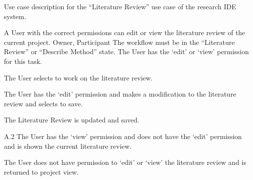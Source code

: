 \begin{table}
  \centering
  \caption{Use case description for the ``Literature Review'' use case of the research IDE system.}
  \label{tbl:use-case-literature-review}

  \begin{usecase}
    A User with the correct permissions can edit or view the literature review of the current project.
    Owner, Participant
    The workflow must be in the “Literature Review” or “Describe Method” state. The User has the ‘edit’ or ‘view’ permission for this task.
    \ucnormal
    \begin{ucenum}
      \item The User selects to work on the literature review.
      \item The User has the ‘edit’ permission and makes a modification to the literature review and selects to save.
      \item The Literature Review is updated and saved.
    \end{ucenum}
    \begin{ucenum}
      \item [A.2] The User has the ‘view’ permission and does not have the ‘edit’ permission and is shown the current literature review.
    \end{ucenum}
    The User does not have permission to ‘edit’ or ‘view’ the literature review and is returned to project view.
  \end{usecase}
\end{table}


